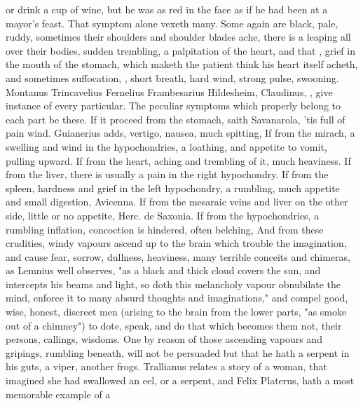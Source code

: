 {or drink a cup of wine, but he was as red in the face as if he had been at a
mayor's feast. That symptom alone vexeth many. Some again
are black, pale, ruddy, sometimes their shoulders and shoulder blades ache,
there is a leaping all over their bodies, sudden trembling, a palpitation of
the heart, and that , grief in the mouth of the stomach,
which maketh the patient think his heart itself acheth, and sometimes
suffocation, , short breath, hard wind, strong pulse,
swooning. Montanus  Trincavelius
 Fernelius
 Frambesarius  Hildesheim, Claudinus, \etc{}, give instance of every
particular. The peculiar symptoms which properly belong to each part be these.
If it proceed from the stomach, saith Savanarola, 'tis
full of pain wind. Guianerius adds, vertigo, nausea, much spitting, \etc{} If
from the mirach, a swelling and wind in the hypochondries, a loathing, and
appetite to vomit, pulling upward. If from the heart, aching and trembling of
it, much heaviness. If from the liver, there is usually a pain in the right
hypochondry. If from the spleen, hardness and grief in the left hypochondry, a
rumbling, much appetite and small digestion, Avicenna. If from the mesaraic
veins and liver on the other side, little or no appetite, Herc. de Saxonia. If
from the hypochondries, a rumbling inflation, concoction is hindered, often
belching, \etc{} And from these crudities, windy vapours ascend up to the brain
which trouble the imagination, and cause fear, sorrow, dullness, heaviness,
many terrible conceits and chimeras, as Lemnius well observes,
 "as a black and thick
cloud covers the sun, and intercepts his beams and light, so doth this
melancholy vapour obnubilate the mind, enforce it to many absurd thoughts and
imaginations," and compel good, wise, honest, discreet men (arising to the
brain from the lower parts, "as smoke out of a chimney")
to dote, speak, and do that which becomes them not, their persons, callings,
wisdoms. One by reason of those ascending vapours and gripings, rumbling
beneath, will not be persuaded but that he hath a serpent in his guts, a viper,
another frogs. Trallianus relates a story of a woman, that imagined she had
swallowed an eel, or a serpent, and Felix Platerus,
 hath a most memorable example of a
}
